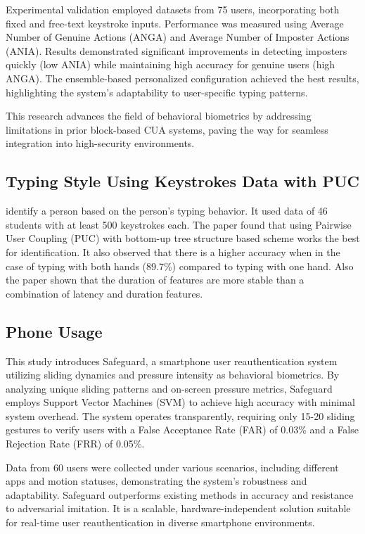 Experimental validation employed datasets from 75 users, incorporating both fixed and free-text keystroke inputs. Performance was measured using Average Number of Genuine Actions (ANGA) and Average Number of Imposter Actions (ANIA). Results demonstrated significant improvements in detecting imposters quickly (low ANIA) while maintaining high accuracy for genuine users (high ANGA). The ensemble-based personalized configuration achieved the best results, highlighting the system's adaptability to user-specific typing patterns.

This research advances the field of behavioral biometrics by addressing limitations in prior block-based CUA systems, paving the way for seamless integration into high-security environments.

\subsection{Typing Style Using Keystrokes Data with PUC}
\label{subsec:typing-style-using-keystrokes-data}

\parencite{22_Keystroke} identify a person based on the person's typing behavior.
It used data of 46 students with at least 500 keystrokes each.
The paper found that using Pairwise User Coupling (PUC) with bottom-up tree structure based scheme works the best for identification.
It also observed that there is a higher accuracy when in the case of typing with both hands (89.7\%) compared to typing with one hand.
Also the paper shown that the duration of features are more stable than a combination of latency and duration features.


\subsection{Phone Usage}

\parencite{17_Phone} This study introduces Safeguard, a smartphone user reauthentication system utilizing sliding dynamics and pressure intensity as behavioral biometrics. By analyzing unique sliding patterns and on-screen pressure metrics, Safeguard employs Support Vector Machines (SVM) to achieve high accuracy with minimal system overhead. The system operates transparently, requiring only 15-20 sliding gestures to verify users with a False Acceptance Rate (FAR) of 0.03\% and a False Rejection Rate (FRR) of 0.05\%.

Data from 60 users were collected under various scenarios, including different apps and motion statuses, demonstrating the system's robustness and adaptability. Safeguard outperforms existing methods in accuracy and resistance to adversarial imitation. It is a scalable, hardware-independent solution suitable for real-time user reauthentication in diverse smartphone environments.
